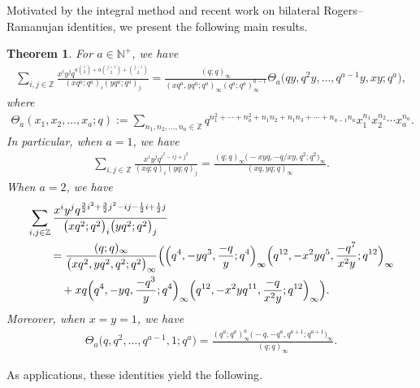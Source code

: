 \documentclass[pdftex]{sigma}
\numberwithin{equation}{section}
\newtheorem{Theorem}{Theorem}[section]
\theoremstyle{definition}
\begin{document}
Motivated by the integral method and recent work on bilateral Rogers--Ramanujan identities, we present the following main results.
\begin{Theorem}\label{main-theorem}
 For $a\in\mathbb{N^+}$, we have
 \begin{align}\label{main-result-a}
 \sum_{i,j\in \mathbb{Z}}\frac{x^iy^jq^{a\binom{i}{2}+a\binom{j+1}{2}+\binom{j-i}{2}}}{(xq^a;q^a)_i(yq^a;q^a)_j} =\frac{(q;q)_{\infty}}{(xq^a,yq^a;q^a)_{\infty}(q^a;q^a)_{\infty}^{a-1}}\Theta_a\bigl(qy,q^2y,\dots,q^{a-1}y,xy;q^a\bigr),\!\!\!
 \end{align}
 where
\begin{align*}
\Theta_a(x_1,x_2,\dots,x_a;q):=\sum_{n_1,n_2,\dots,n_a\in \mathbb{Z}}q^{n_1^2+\cdots+n_a^2+n_1n_2+n_1n_3+\cdots+n_{a-1}n_a}x_1^{n_1}x_2^{n_2}\cdots x_a^{n_a}.
\end{align*}
In particular, when $a=1$, we have
\begin{align}\label{main-result-1}
 \sum_{i,j \in \mathbb{Z}} \frac{x^i y^j q^{i^2 - ij + j^2}}{(xq; q)_i (yq; q)_j} = \frac{(q; q)_{\infty} \bigl(-xyq, -q/xy, q^2; q^2\bigr)_{\infty}}{(xq, yq; q)_{\infty}}.
\end{align}
When $a=2$, we have
\begin{align}
 &\sum_{i,j\in\mathbb{Z}}\frac{x^iy^jq^{\frac{3}{2}i^2+\frac{3}{2}j^2-ij-\frac{1}{2}i +\frac{1}{2}j}}{\bigl(xq^2;q^2\bigr)_i\bigl(yq^2;q^2\bigr)_j}\nonumber\\
 & \qquad =\frac{(q;q)_{\infty}}{\bigl(xq^2,yq^2,q^2;q^2\bigr)_{\infty}} \Bigl(\Bigl(q^4,-yq^3,\frac{-q}{y};q^4\Bigr)_{\infty}\Bigl(q^{12},-x^2yq^5,\frac{-q^7}{x^2y};q^{12}\Bigr)_{\infty}\nonumber\\
 &\qquad \quad {}+xq\Bigl(q^4,-yq,\frac{-q^3}{y};q^4\Bigr)_{\infty}\Bigl(q^{12},-x^2yq^{11},\frac{-q}{x^2y};q^{12}\Bigr)_{\infty}\Bigr).\label{main-result-2}
\end{align}
Moreover, when $x=y=1$, we have
\begin{align}\label{main-result-3}
\Theta_a\bigl(q,q^2,\dots,q^{a-1},1;q^a\bigr) =\frac{(q^a;q^a)^a_{\infty}\bigl(-q,-q^a,q^{a+1};q^{a+1}\bigr)_{\infty}}{(q;q)_{\infty}}.
\end{align}
\end{Theorem}
As applications, these identities yield the following.
\end{document}
